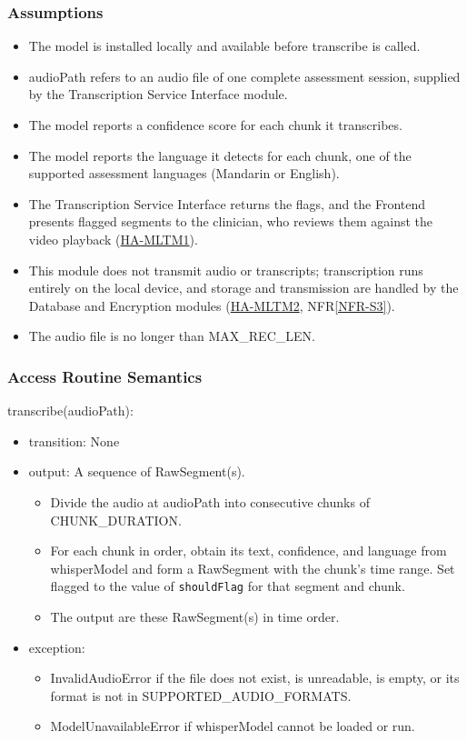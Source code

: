 \documentclass[12pt, titlepage]{article}
\newcommand{\hazref}[1]{\href{https://github.com/Nour-Fawaz/MacaBoca/blob/main/pdfs/HazardAnalysis/HazardAnalysis.pdf}{#1}}
\begin{document}
\subsubsection{Assumptions}
\begin{itemize}
\item The model is installed locally and available before transcribe is called.
\item audioPath refers to an audio file of one complete assessment session, supplied by the Transcription Service Interface module.
\item The model reports a confidence score for each chunk it transcribes.
\item The model reports the language it detects for each chunk, one of the supported assessment languages (Mandarin or English).
\item The Transcription Service Interface returns the flags, and the Frontend presents flagged segments to the clinician, who reviews them against the video playback (\hazref{HA-MLTM1}).
\item This module does not transmit audio or transcripts; transcription runs entirely on the local device, and storage and transmission are handled by the Database and Encryption modules (\hazref{HA-MLTM2}, NFR\ref{NFR-S3}).
\item The audio file is no longer than MAX\_REC\_LEN.
\end{itemize}

\subsubsection{Access Routine Semantics}

\noindent transcribe(audioPath):
\begin{itemize}
\item transition: None
\item output: A sequence of RawSegment(s).
  \begin{itemize}
  \item Divide the audio at audioPath into consecutive chunks of CHUNK\_DURATION.
  \item For each chunk in order, obtain its text, confidence, and language from whisperModel and form a RawSegment with the chunk's time range. Set flagged to the value of \texttt{shouldFlag} for that segment and chunk.
  \item The output are these RawSegment(s) in time order.
  \end{itemize}
\item exception:
  \begin{itemize}
  \item InvalidAudioError if the file does not exist, is unreadable, is empty, or its format is not in SUPPORTED\_AUDIO\_FORMATS.
  \item ModelUnavailableError if whisperModel cannot be loaded or run.
  \end{itemize}
\end{itemize}
\end{document}
